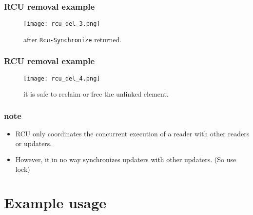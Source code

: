 \documentclass{beamer}
\begin{document}

\begin{frame}[t]
  \frametitle{RCU removal example}

  \begin{figure}[ht]
    \centering
    \texttt{[image: rcu\_del\_3.png]}
    \caption{after \texttt{Rcu-Synchronize} returned.}
  \end{figure}
  
\end{frame}


\begin{frame}[t]
  \frametitle{RCU removal example}

  \begin{figure}[ht]
    \centering
    \texttt{[image: rcu\_del\_4.png]}
    \caption{it is safe to reclaim or free the unlinked element.}
  \end{figure}
  
\end{frame}


\begin{frame}[t]
  \frametitle{note}

  \begin{itemize}
  \item RCU only coordinates the concurrent execution of a reader with other readers or
    updaters.
  \item However, it in no way synchronizes updaters with other updaters. (So use lock)
  \end{itemize}
  
\end{frame}


\section{Example usage}

\end{document}
